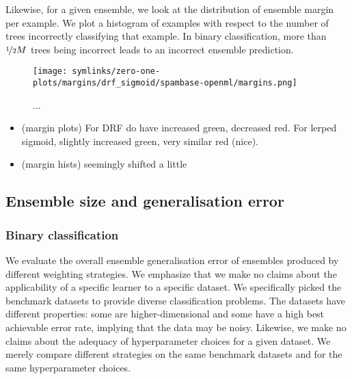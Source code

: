 \documentclass[../main.tex]{subfiles}
\begin{document}
Likewise, for a given ensemble, we look at the distribution of ensemble margin per example. We plot a histogram of examples with respect to the number of trees incorrectly classifying that example. In binary classification, more than $\nicefrac{1}{2}M$ trees being incorrect leads to an incorrect ensemble prediction. %

\begin{figure*}
    \texttt{[image: symlinks/zero-one-plots/margins/drf\_sigmoid/spambase-openml/margins.png]}
    \caption{
        ...
    }
    \label{fig:margins}
\end{figure*}

\begin{observation} %
    \begin{itemize}
        \item (margin plots) For DRF do have increased green, decreased red. For lerped sigmoid, slightly increased green, very similar red (nice).
        \item (margin hists) seemingly shifted a little
    \end{itemize}
\end{observation}

\subsection{Ensemble size and generalisation error}

\subsubsection{Binary classification}

We evaluate the overall ensemble generalisation error of ensembles produced by different weighting strategies. We emphasize that we make no claims about the applicability of a specific learner to a specific dataset. We specifically picked the benchmark datasets to provide diverse classification problems. The datasets have different properties: some are higher-dimensional and some have a high best achievable error rate, implying that the data may be noisy. Likewise, we make no claims about the adequacy of hyperparameter choices for a given dataset. 
We merely compare different strategies on the same benchmark datasets and for the same hyperparameter choices.
\end{document}
